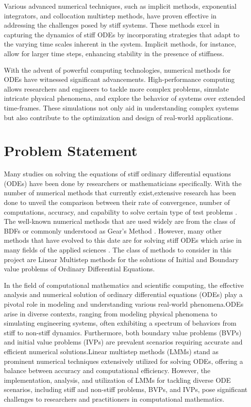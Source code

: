 Various advanced numerical techniques, such as implicit methods, exponential integrators, and collocation multistep methods, have proven effective in addressing the challenges posed by stiff systems. These methods excel in capturing the dynamics of stiff ODEs by incorporating strategies that adapt to the varying time scales inherent in the system. Implicit methods, for instance, allow for larger time steps, enhancing stability in the presence of stiffness.

With the advent of powerful computing technologies, numerical methods for ODEs have witnessed significant advancements. High-performance computing allows researchers and engineers to tackle more complex problems, simulate intricate physical phenomena, and explore the behavior of systems over extended time-frames. These simulations not only aid in understanding complex systems but also contribute to the optimization and design of real-world applications.

\section{Problem Statement}

Many studies on solving the equations of stiff ordinary differential equations (ODEs) have been done by researchers or mathematicians specifically. With the number of numerical methods that currently exist,extensive research has been done to unveil the comparison between their rate of convergence, number of computations, accuracy, and capability to solve certain type of test problems \cite{Enright1975} . The well-known numerical methods that are used widely are from the class of BDFs or commonly understood as Gear’s Method \cite{BYRNE1977125}. 
However, many other methods that have evolved to this date are for solving stiff ODEs which arise in many fields of the applied sciences \cite{Yatim2013}. The class of methods to consider in this project are Linear Multistep methods for the solutions of Initial and Boundary value problems of Ordinary Differential Equations.

In the field of computational mathematics and scientific computing, the effective analysis and numerical solution of ordinary differential equations (ODEs) play a pivotal role in modeling and understanding various real-world phenomena.ODEs arise in diverse contexts, ranging from modeling physical phenomena to simulating engineering systems, often exhibiting a spectrum of behaviors from stiff to non-stiff dynamics. Furthermore, both boundary value problems (BVPs) and initial value problems (IVPs) are prevalent scenarios requiring accurate and efficient numerical solutions.Linear multistep methods (LMMs) stand as prominent numerical techniques extensively utilized for solving ODEs, offering a balance between accuracy and computational efficiency. However, the implementation, analysis, and utilization of LMMs for tackling diverse ODE scenarios, including stiff and non-stiff problems, BVPs, and IVPs, pose significant challenges to researchers and practitioners in computational mathematics.

